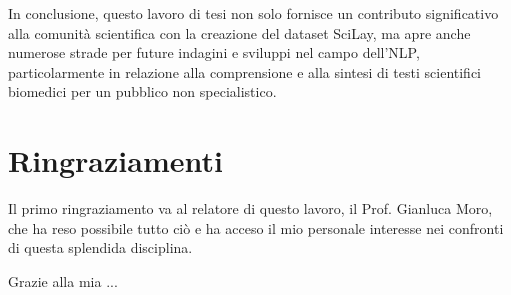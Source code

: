 \documentclass[12pt,a4paper,twoside,openright]{book}
\begin{document}
In conclusione, questo lavoro di tesi non solo fornisce un contributo significativo alla comunità scientifica con la creazione del dataset SciLay, ma apre anche numerose strade per future indagini e sviluppi nel campo dell'NLP, particolarmente in relazione alla comprensione e alla sintesi di testi scientifici biomedici per un pubblico non specialistico.

\chapter*{Ringraziamenti}

Il primo ringraziamento va al relatore di questo lavoro, il Prof. Gianluca Moro, che ha reso possibile tutto ciò e ha acceso il mio personale interesse nei confronti di questa splendida disciplina.

Grazie alla mia ...
	
\backmatter	
{}



\end{document}
